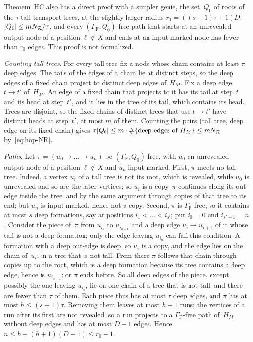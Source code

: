 \begin{remark}\label{rem:HC-direct}
Theorem~HC also has a direct proof with a simpler genie, the set~$Q_0$ of roots of the $\tau$-tall transport trees, at
the slightly larger radius $r_0=((s+1)\tau+1)D$: $\lvert Q_0 \rvert\le mN_{\mathcal R}/\tau$, and every
$(\Gamma_{\mathrm F},Q_0)$-free path that starts at an unrevealed output node of a position $\ell\notin X$ and ends at an
input-marked node has fewer than $r_0$ edges. This proof is not formalized.

\emph{Counting tall trees.} For every tall tree fix a node whose chain contains at least $\tau$ deep edges. The tails of
the edges of a chain lie at distinct steps, so the deep edges of a fixed chain project to distinct deep edges of~$H_M$.
Fix a deep edge $t\to t'$ of~$H_M$. An edge of a fixed chain that projects to it has its tail at step~$t$ and its head at
step~$t'$, and it lies in the tree of its tail, which contains its head. Trees are disjoint, so the fixed chains of
distinct trees that use $t\to t'$ have distinct heads at step~$t'$, at most $m$ of them. Counting the pairs (tall tree,
deep edge on its fixed chain) gives $\tau\lvert Q_0 \rvert\le m\cdot\#\{\text{deep edges of }H_M\}\le mN_{\mathcal R}$
by~\eqref{eq:hop-NR}.

\emph{Paths.} Let $\pi=(u_0\to\dots\to u_n)$ be $(\Gamma_{\mathrm F},Q_0)$-free, with $u_0$ an unrevealed output node of
a position $\ell\notin X$ and $u_n$ input-marked. First, $\pi$ meets no tall tree. Indeed, a vertex $u_i$ of a tall tree
is not its root, which is revealed, while $u_0$ is unrevealed and so are the later vertices; so $u_i$ is a copy, $\pi$
continues along its out-edge inside the tree, and by the same argument through copies of that tree to its end; but
$u_n$ is input-marked, hence not a copy. Second, $\pi$ is $\Gamma_{\mathrm F}$-free, so it contains at most $s$ deep
formations, say at positions $i_1<\dots<i_{s'}$; put $i_0=0$ and $i_{s'+1}=n$. Consider the piece of~$\pi$ from
$u_{i_a}$ to $u_{i_{a+1}}$ and a deep edge $u_i\to u_{i+1}$ of it whose tail is not a deep formation; only the edge
leaving $u_{i_a}$ can fail this condition. A formation with a deep out-edge is deep, so $u_i$ is a copy, and the edge lies
on the chain of~$u_i$, in a tree that is not tall. From there $\pi$ follows that chain through copies up to the root,
which is a deep formation because its tree contains a deep edge, hence is $u_{i_{a+1}}$; or $\pi$ ends before. So all
deep edges of the piece, except possibly the one leaving $u_{i_a}$, lie on one chain of a tree that is not tall, and there
are fewer than $\tau$ of them. Each piece thus has at most $\tau$ deep edges, and $\pi$ has at most $h\le(s+1)\tau$.
Removing them leaves at most $h+1$ runs; the vertices of a run after its first are not revealed, so a run projects to a
$\Gamma_{\mathrm F}$-free path of~$H_M$ without deep edges and has at most $D-1$ edges. Hence
$n\le h+(h+1)(D-1)\le r_0-1$.


\end{remark}
